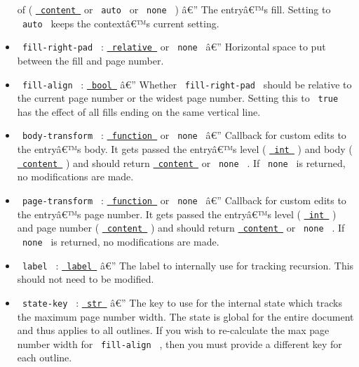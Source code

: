 \begin{itemize}
  of (
  \href{https://typst.app/docs/reference/foundations/content/}{\texttt{\ content\ }}
  or \texttt{\ auto\ } or \texttt{\ none\ } ) â€'' The entryâ€™s fill.
  Setting to \texttt{\ auto\ } keeps the contextâ€™s current setting.
\item
  \texttt{\ fill-right-pad\ } :
  \href{https://typst.app/docs/reference/layout/relative/}{\texttt{\ relative\ }}
  or \texttt{\ none\ } â€'' Horizontal space to put between the fill and
  page number.
\item
  \texttt{\ fill-align\ } :
  \href{https://typst.app/docs/reference/foundations/bool/}{\texttt{\ bool\ }}
  â€'' Whether \texttt{\ fill-right-pad\ } should be relative to the
  current page number or the widest page number. Setting this to
  \texttt{\ true\ } has the effect of all fills ending on the same
  vertical line.
\item
  \texttt{\ body-transform\ } :
  \href{https://typst.app/docs/reference/foundations/function/}{\texttt{\ function\ }}
  or \texttt{\ none\ } â€'' Callback for custom edits to the entryâ€™s
  body. It gets passed the entryâ€™s level (
  \href{https://typst.app/docs/reference/foundations/int/}{\texttt{\ int\ }}
  ) and body (
  \href{https://typst.app/docs/reference/foundations/content/}{\texttt{\ content\ }}
  ) and should return
  \href{https://typst.app/docs/reference/foundations/content/}{\texttt{\ content\ }}
  or \texttt{\ none\ } . If \texttt{\ none\ } is returned, no
  modifications are made.
\item
  \texttt{\ page-transform\ } :
  \href{https://typst.app/docs/reference/foundations/function/}{\texttt{\ function\ }}
  or \texttt{\ none\ } â€'' Callback for custom edits to the entryâ€™s
  page number. It gets passed the entryâ€™s level (
  \href{https://typst.app/docs/reference/foundations/int/}{\texttt{\ int\ }}
  ) and page number (
  \href{https://typst.app/docs/reference/foundations/content/}{\texttt{\ content\ }}
  ) and should return
  \href{https://typst.app/docs/reference/foundations/content/}{\texttt{\ content\ }}
  or \texttt{\ none\ } . If \texttt{\ none\ } is returned, no
  modifications are made.
\item
  \texttt{\ label\ } :
  \href{https://typst.app/docs/reference/foundations/label/}{\texttt{\ label\ }}
  â€'' The label to internally use for tracking recursion. This should
  not need to be modified.
\item
  \texttt{\ state-key\ } :
  \href{https://typst.app/docs/reference/foundations/str/}{\texttt{\ str\ }}
  â€'' The key to use for the internal state which tracks the maximum
  page number width. The state is global for the entire document and
  thus applies to all outlines. If you wish to re-calculate the max page
  number width for \texttt{\ fill-align\ } , then you must provide a
  different key for each outline.
\end{itemize}

